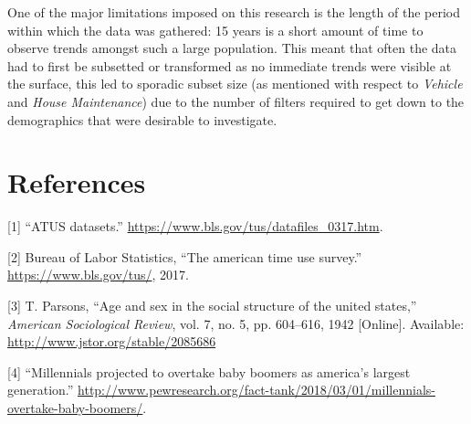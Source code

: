 \documentclass[11pt,]{article}
\begin{document}
One of the major limitations imposed on this research is the length of
the period within which the data was gathered: 15 years is a short
amount of time to observe trends amongst such a large population. This
meant that often the data had to first be subsetted or transformed as no
immediate trends were visible at the surface, this led to sporadic
subset size (as mentioned with respect to \emph{Vehicle} and \emph{House
Maintenance}) due to the number of filters required to get down to the
demographics that were desirable to investigate.

\parindent0pt

\hypertarget{references}{%
\section*{References}\label{references}}

\hypertarget{refs}{}
\leavevmode\hypertarget{ref-atusdatasets}{}%
{[}1{]} ``ATUS datasets.''
\url{https://www.bls.gov/tus/datafiles_0317.htm}.

\leavevmode\hypertarget{ref-ATUS}{}%
{[}2{]} Bureau of Labor Statistics, ``The american time use survey.''
\url{https://www.bls.gov/tus/}, 2017.

\leavevmode\hypertarget{ref-10.2307ux2f2085686}{}%
{[}3{]} T. Parsons, ``Age and sex in the social structure of the united
states,'' \emph{American Sociological Review}, vol. 7, no. 5, pp.
604--616, 1942 {[}Online{]}. Available:
\url{http://www.jstor.org/stable/2085686}

\leavevmode\hypertarget{ref-generations}{}%
{[}4{]} ``Millennials projected to overtake baby boomers as america's
largest generation.''
\url{http://www.pewresearch.org/fact-tank/2018/03/01/millennials-overtake-baby-boomers/}.
\end{document}
